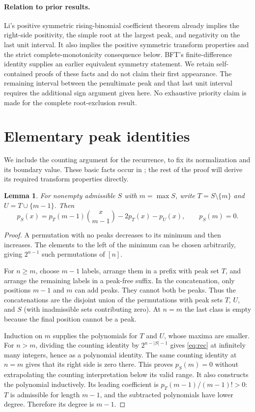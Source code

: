 \documentclass[11pt]{article}
\newtheorem{lemma}[theorem]{Lemma}
\theoremstyle{definition}
\begin{document}
\paragraph{Relation to prior results.}
Li's positive symmetric rising-binomial coefficient theorem
\cite[Eq.~(2), Theorem~1.1]{Li} already implies the right-side positivity,
the simple root at the largest peak, and negativity on the last unit interval.
It also implies the positive symmetric transform properties and the strict
complete-monotonicity consequence below. BFT's finite-difference identity
\cite[Theorem~4.3]{BFT} supplies an earlier equivalent symmetry statement.
We retain self-contained proofs of these facts and do not claim their first
appearance. The remaining interval between the penultimate peak and that last
unit interval requires the additional sign argument given here. No exhaustive
priority claim is made for the complete root-exclusion result.

\section{Elementary peak identities}
We include the counting argument for the recurrence, to fix its normalization and its boundary value. These basic facts occur in \cite[Theorem 1.1 and Corollary 3.1]{BFT}; the rest of the proof will derive its required transform properties directly.

\begin{lemma}\label{lem:rec}
For nonempty admissible $S$ with $m=\max S$, write $T=S\setminus\{m\}$ and $U=T\cup\{m-1\}$. Then
\begin{equation}\label{eq:rec}
 p_S(x)=p_T(m-1)\binom{x}{m-1}-2p_T(x)-p_U(x),
 \qquad p_S(m)=0.
\end{equation}
\end{lemma}
\begin{proof}
A permutation with no peaks decreases to its minimum and then increases. The elements to the left of the minimum can be chosen arbitrarily, giving $2^{n-1}$ such permutations of $[n]$.

For $n\ge m$, choose $m-1$ labels, arrange them in a prefix with peak set $T$, and arrange the remaining labels in a peak-free suffix. In the concatenation, only positions $m-1$ and $m$ can add peaks. They cannot both be peaks. Thus the concatenations are the disjoint union of the permutations with peak sets $T$, $U$, and $S$ (with inadmissible sets contributing zero). At $n=m$ the last class is empty because the final position cannot be a peak.

Induction on $m$ supplies the polynomials for $T$ and $U$, whose maxima are smaller. For $n>m$, dividing the counting identity by $2^{n-|S|-1}$ gives \eqref{eq:rec} at infinitely many integers, hence as a polynomial identity. The same counting identity at $n=m$ gives that its right side is zero there. This proves $p_S(m)=0$ without extrapolating the counting interpretation below its valid range. It also constructs the polynomial inductively. Its leading coefficient is $p_T(m-1)/(m-1)!>0$: $T$ is admissible for length $m-1$, and the subtracted polynomials have lower degree. Therefore its degree is $m-1$.
\end{proof}
\end{document}

